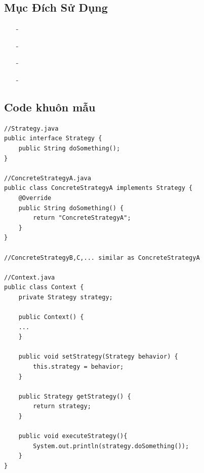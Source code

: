 \documentclass{article}
\newcommand\subpara{\fontsize{13}{13}\selectfont \fontseries{b}\selectfont}
\begin{document}
    \subsection{Mục Đích Sử Dụng}
    \begin{itemize}
        \item[-]\subpara{Muốn thay đổi các thuật toán được sử dụng bên trong một đối tượng tại thời điểm run-time}
        \item[-]\subpara{Bảo trì những đoạn code dễ thay đổi}
        \item[-]\subpara{Tránh sự rắc rối, khi phải hiện thực một chức năng nào đó qua quá nhiều lớp con}
        \item[-]\subpara{Che giấu sự phức tạp, cấu trúc bên trong của thuật toán}
    \end{itemize}

    \subsection{Code khuôn mẫu}
    \begin{lstlisting}
//Strategy.java
public interface Strategy {
    public String doSomething();
}

//ConcreteStrategyA.java
public class ConcreteStrategyA implements Strategy {
    @Override
    public String doSomething() {
        return "ConcreteStrategyA";
    }
}

//ConcreteStrategyB,C,... similar as ConcreteStrategyA

//Context.java
public class Context {
    private Strategy strategy;

    public Context() {
    ...
    }

    public void setStrategy(Strategy behavior) {
        this.strategy = behavior;
    }

    public Strategy getStrategy() {
        return strategy;
    }

    public void executeStrategy(){
        System.out.println(strategy.doSomething());
    }
}
    \end{lstlisting}
\end{document}

